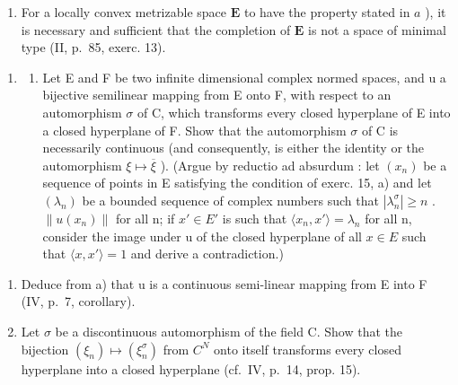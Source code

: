 \begin{enumerate}
\def\labelenumi{\alph{enumi})}
\setcounter{enumi}{1}
\tightlist
\item
  For a locally convex metrizable space \(\mathbf{E}\) to have the property stated in \(a\) ), it is necessary and sufficient that the completion of \(\mathbf{E}\) is not a space of minimal type (II, p.~85, exerc. 13).
\end{enumerate}

\begin{enumerate}
\def\labelenumi{\arabic{enumi})}
\setcounter{enumi}{15}
\tightlist
\item
  \begin{enumerate}
  \def\labelenumii{\alph{enumii})}
  \tightlist
  \item
    Let E and F be two infinite dimensional complex normed spaces, and u a bijective semilinear mapping from E onto F, with respect to an automorphism \(\sigma\) of C, which transforms every closed hyperplane of E into a closed hyperplane of F. Show that the automorphism \(\sigma\) of C is necessarily continuous (and consequently, is either the identity or the automorphism \(\xi \mapsto \overline{\xi}\) ). (Argue by reductio ad absurdum : let \((x_{n})\) be a sequence of points in E satisfying the condition of exerc. 15, a) and let \((\lambda_{n})\) be a bounded sequence of complex numbers such that \(|\lambda_{n}^{\sigma}| \geqslant n\) . \(\|u(x_{n})\|\) for all n; if \(x' \in E'\) is such that \(\langle x_{n}, x' \rangle = \lambda_{n}\) for all n, consider the image under u of the closed hyperplane of all \(x \in E\) such that \(\langle x, x' \rangle = 1\) and derive a contradiction.)
  \end{enumerate}
\end{enumerate}

\begin{enumerate}
\def\labelenumi{\alph{enumi})}
\setcounter{enumi}{1}
\tightlist
\item
  Deduce from a) that u is a continuous semi-linear mapping from E into F (IV, p.~7, corollary).
\item
  Let \(\sigma\) be a discontinuous automorphism of the field C. Show that the bijection \((\xi_{n})\mapsto(\xi_{n}^{\sigma})\) from \(C^{N}\) onto itself transforms every closed hyperplane into a closed hyperplane (cf.~IV, p.~14, prop. 15).
\end{enumerate}

